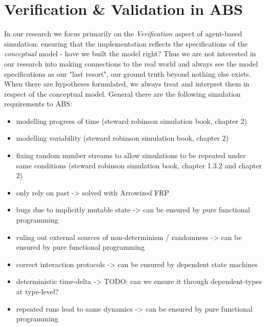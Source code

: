 \section{Verification \& Validation in ABS}
\label{sec:vav_abs}
In our research we focus primarily on the \textit{Verification} aspect of agent-based simulation: ensuring that the implementation reflects the specifications of the \textit{conceptual} model - have we built the model right? Thus we are not interested in our research into making connections to the real world and always see the model specifications as our "last resort", our ground truth beyond nothing else exists. When there are hypotheses formulated, we always treat and interpret them in respect of the conceptual model. General there are the following simulation requirements to ABS:

\begin{itemize}
	\item modelling progress of time (steward robinson simulation book, chapter 2)
	\item modelling variability (steward robinson simulation book, chapter 2)
	\item fixing random number streams to allow simulations to be repeated under same conditions (steward robinson simulation book, chapter 1.3.2 and chapter 2)
	\item only rely on past -> solved with Arrowized FRP
	\item bugs due to implicitly mutable state -> can be ensured by pure functional programming
	\item ruling out external sources of non-determinism / randomness -> can be ensured by pure functional programming
	\item correct interaction protocols	-> can be ensured by dependent state machines
	\item deterministic time-delta -> TODO: can we ensure it through dependent-types at type-level?
	\item repeated runs lead to same dynamics -> can be ensured by pure functional programming
\end{itemize}

